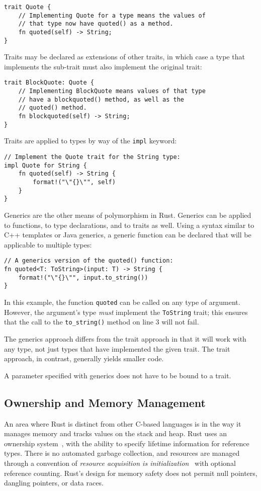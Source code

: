 \begin{lstlisting}
trait Quote {
    // Implementing Quote for a type means the values of
    // that type now have quoted() as a method.
    fn quoted(self) -> String;
}
\end{lstlisting}

Traits may be declared as extensions of other traits, in which case a type that implements the sub-trait must also implement the original trait:

\begin{lstlisting}
trait BlockQuote: Quote {
    // Implementing BlockQuote means values of that type
    // have a blockquoted() method, as well as the
    // quoted() method.
    fn blockquoted(self) -> String;
}
\end{lstlisting}

Traits are applied to types by way of the \texttt{impl} keyword:

\begin{lstlisting}
// Implement the Quote trait for the String type:
impl Quote for String {
    fn quoted(self) -> String {
        format!("\"{}\"", self)
    }
}
\end{lstlisting}

Generics are the other means of polymorphism in Rust. Generics can be applied to functions, to type declarations, and to traits as well. Using a syntax similar to C++ templates or Java generics, a generic function can be declared that will be applicable to multiple types:

\begin{lstlisting}
// A generics version of the quoted() function:
fn quoted<T: ToString>(input: T) -> String {
    format!("\"{}\"", input.to_string())
}
\end{lstlisting}

In this example, the function \texttt{quoted} can be called on any type of argument. However, the argument's type \textit{must} implement the \texttt{ToString} trait; this ensures that the call to the \texttt{to\_string()} method on line 3 will not fail.

The generics approach differs from the trait approach in that it will work with any type, not just types that have implemented the given trait. The trait approach, in contrast, generally yields smaller code.

A parameter specified with generics does not have to be bound to a trait.

\subsection{Ownership and Memory Management}

An area where Rust is distinct from other C-based languages is in the way it manages memory and tracks values on the stack and heap. Rust uses an ownership system~\cite[Chapter~4]{programming.rust.2021}, with the ability to specify lifetime information for reference types. There is no automated garbage collection, and resources are managed through a convention of \textit{resource acquisition is initialization}~\cite{cpp.design.evolution.1994} with optional reference counting. Rust's design for memory safety does not permit null pointers, dangling pointers, or data races.
